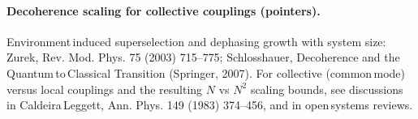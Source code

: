 \documentclass[11pt]{article}
\begin{document}
\paragraph{Decoherence scaling for collective couplings (pointers).}
\noindent Environment\,induced superselection and dephasing growth with system size: Zurek, Rev. Mod. Phys. 75 (2003) 715--775; Schlosshauer, Decoherence and the Quantum\,to\,Classical Transition (Springer, 2007). For collective (common\,mode) versus local couplings and the resulting $N$ vs $N^2$ scaling bounds, see discussions in Caldeira\,Leggett, Ann. Phys. 149 (1983) 374--456, and in open\,systems reviews.
\end{document}
